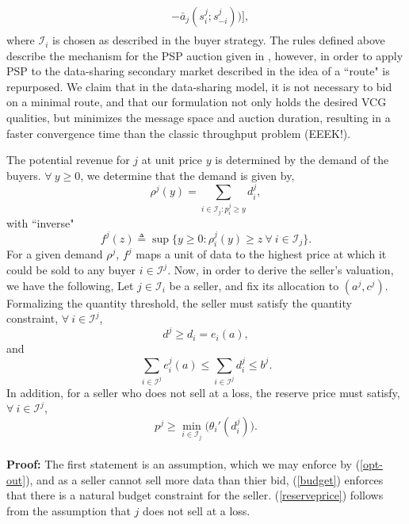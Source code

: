 \documentclass[12pt]{article}
\theoremstyle{definition}
\newcommand{\mcI}{\mathcal{I}}
\begin{document}
\begin{multicols}{2}
\begin{align}
\begin{split}
    &-\bar{a}_j(s_i^j;s_{-i}^j)\bigg) \bigg\rbrack,
\end{split}
\end{align}
where $\mcI_i$ is chosen as described in the buyer strategy.
The rules defined above describe the mechanism for the PSP auction given in
\cite{lazar}, however, in order to apply PSP to the data-sharing secondary market described in
\cite{zheng} the idea of a ``route" is repurposed. We claim that in the
data-sharing model, it is not necessary to bid on a minimal route, and that our
formulation not only holds the desired VCG qualities, but minimizes the message
space and auction duration, resulting in a faster convergence time than the
classic throughput problem (EEEK!).

The potential revenue for $j$ at unit price $y$ is determined by the
demand of the buyers. $\forall \ y\ge 0$, we determine that the demand is given by,
\begin{equation}\label{datademand}
    \rho^j(y) = \sum_{i\in\mcI_j : p_i^j\ge y} d_i^j, 
\end{equation}
with ``inverse"
\begin{equation}\label{revenue}
    f^j(z) \triangleq \sup\big\lbrace y\ge 0:
        \rho_i^j(y) \ge z \ \forall \ i \in \mcI_j\big\rbrace.
\end{equation}
For a given demand $\rho^j$, $f^j$ maps a unit of data to the highest price at
which it could be sold to any buyer $i\in \mcI^j$.
Now, in order to derive the seller's valuation, we have the following,
{
\label{constraints}
Let $j\in\mcI_i$ be a seller, and fix its allocation to $(a^j,c^j)$.
Formalizing the quantity threshold, the seller must satisfy the quantity
constraint, $\forall \ i \in\mcI^j$,
\begin{equation}\label{quantity}
    d^j \ge d_i = e_i(a),
\end{equation}
and
\begin{equation}\label{budget}
    \displaystyle\sum_{i\in\mcI^j} e_i^j(a) \le \sum_{i\in\mcI^j} d^j_i \le b^j.
\end{equation}
In addition, for a seller who does not sell at a loss, the reserve price must
satisfy, $\forall \ i \in \mcI^j$,
\begin{equation}\label{reserveprice}
   p^j \ge \min_{i\in\mcI_j}\big({\theta_i}'(d_i^j)\big).
\end{equation}
}\\
\textbf{Proof:}
The first statement is an assumption, which we may enforce by (\ref{opt-out}),
and as a seller cannot sell more data than thier bid, (\ref{budget}) enforces
that there is a natural budget constraint for the seller. (\ref{reserveprice})
follows from the assumption that $j$ does not sell at a loss.


\end{multicols}
\end{document}
